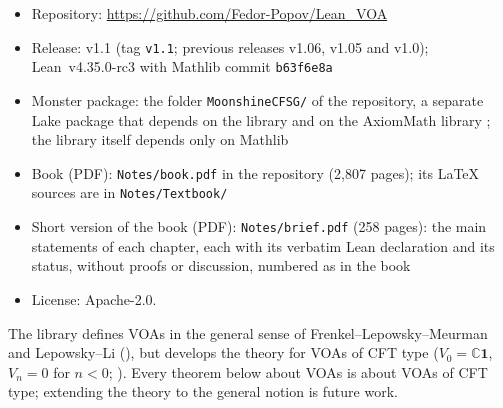 \documentclass[10pt]{article}
\newcommand{\C}{\mathbb{C}}
\begin{document}
\begin{itemize}
  \item Repository: \url{https://github.com/Fedor-Popov/Lean_VOA}
  \item Release: v1.1 (tag \texttt{v1.1}; previous releases v1.06, v1.05 and v1.0); Lean~v4.35.0-rc3 with Mathlib
    commit \texttt{b63f6e8a}
  \item Monster package: the folder \texttt{MoonshineCFSG/} of the repository, a separate Lake package that depends on
    the library and on the AxiomMath library \cite{AxiomCFSG}; the library itself depends only on Mathlib
  \item Book (PDF): \texttt{Notes/book.pdf} in the repository (2{,}807 pages); its \LaTeX{} sources are in
    \texttt{Notes/Textbook/}
  \item Short version of the book (PDF): \texttt{Notes/brief.pdf} (258 pages): the main statements of each chapter,
    each with its verbatim Lean declaration and its status, without proofs or discussion, numbered as in the book
  \item License: Apache-2.0.
\end{itemize}

The library defines VOAs in the general sense of Frenkel--Lepowsky--Meurman and Lepowsky--Li \cite{FLM,LepowskyLi}
(), but develops the theory for VOAs of CFT type ($V_0=\C\mathbf 1$, $V_n=0$ for
$n<0$; ). Every theorem below about VOAs is about VOAs of CFT type; extending the theory
to the general notion is future work.
\end{document}
